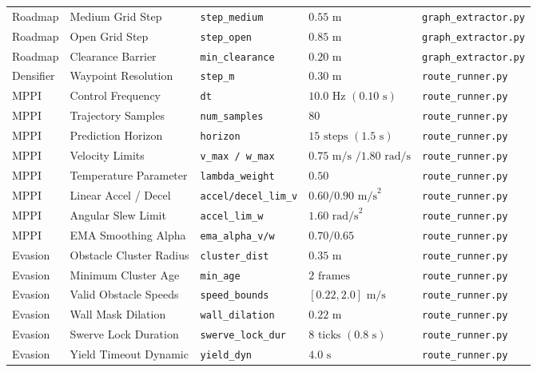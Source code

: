 \documentclass[10pt,a4paper]{article}
\begin{document}
\begin{center}
\begin{tabular}{|l|l|l|l|l|}
Roadmap & Medium Grid Step & \texttt{step\_medium} & $0.55\text{ m}$ & \texttt{graph\_extractor.py} \\
Roadmap & Open Grid Step & \texttt{step\_open} & $0.85\text{ m}$ & \texttt{graph\_extractor.py} \\
Roadmap & Clearance Barrier & \texttt{min\_clearance} & $0.20\text{ m}$ & \texttt{graph\_extractor.py} \\
Densifier & Waypoint Resolution & \texttt{step\_m} & $0.30\text{ m}$ & \texttt{route\_runner.py} \\
\hline
MPPI & Control Frequency & \texttt{dt} & $10.0\text{ Hz } (0.10\text{ s})$ & \texttt{route\_runner.py} \\
MPPI & Trajectory Samples & \texttt{num\_samples} & $80$ & \texttt{route\_runner.py} \\
MPPI & Prediction Horizon & \texttt{horizon} & $15\text{ steps } (1.5\text{ s})$ & \texttt{route\_runner.py} \\
MPPI & Velocity Limits & \texttt{v\_max / w\_max} & $0.75\text{ m/s } / 1.80\text{ rad/s}$ & \texttt{route\_runner.py} \\
MPPI & Temperature Parameter & \texttt{lambda\_weight} & $0.50$ & \texttt{route\_runner.py} \\
MPPI & Linear Accel / Decel & \texttt{accel/decel\_lim\_v} & $0.60 / 0.90\text{ m/s}^2$ & \texttt{route\_runner.py} \\
MPPI & Angular Slew Limit & \texttt{accel\_lim\_w} & $1.60\text{ rad/s}^2$ & \texttt{route\_runner.py} \\
MPPI & EMA Smoothing Alpha & \texttt{ema\_alpha\_v/w} & $0.70 / 0.65$ & \texttt{route\_runner.py} \\
\hline
Evasion & Obstacle Cluster Radius & \texttt{cluster\_dist} & $0.35\text{ m}$ & \texttt{route\_runner.py} \\
Evasion & Minimum Cluster Age & \texttt{min\_age} & $2\text{ frames}$ & \texttt{route\_runner.py} \\
Evasion & Valid Obstacle Speeds & \texttt{speed\_bounds} & $[0.22, 2.0]\text{ m/s}$ & \texttt{route\_runner.py} \\
Evasion & Wall Mask Dilation & \texttt{wall\_dilation} & $0.22\text{ m}$ & \texttt{route\_runner.py} \\
Evasion & Swerve Lock Duration & \texttt{swerve\_lock\_dur} & $8\text{ ticks } (0.8\text{ s})$ & \texttt{route\_runner.py} \\
Evasion & Yield Timeout Dynamic & \texttt{yield\_dyn} & $4.0\text{ s}$ & \texttt{route\_runner.py} \\

\end{tabular}
\end{center}
\end{document}
